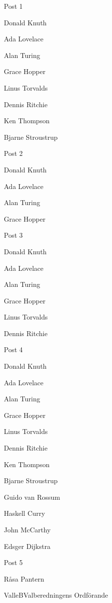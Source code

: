 \documentclass{dsekelectionproposal}
\begin{document}
\setdate{\today}

\begin{vemsection}

    \begin{vemlist}{Post 1}
        \item Donald Knuth
        \item Ada Lovelace
        \item Alan Turing
        \item Grace Hopper
        \item Linus Torvalds
        \item Dennis Ritchie
        \item Ken Thompson
        \item Bjarne Stroustrup
    \end{vemlist}

    \begin{vemlist}{Post 2}
        \item Donald Knuth
        \item Ada Lovelace
        \item Alan Turing
        \item Grace Hopper
    \end{vemlist}

    \begin{vemlist}{Post 3}
        \item Donald Knuth
        \item Ada Lovelace
        \item Alan Turing
        \item Grace Hopper
        \item Linus Torvalds
        \item Dennis Ritchie
    \end{vemlist}

    \begin{vemlist}{Post 4}
        \item Donald Knuth
        \item Ada Lovelace
        \item Alan Turing
        \item Grace Hopper
        \item Linus Torvalds
        \item Dennis Ritchie
        \item Ken Thompson
        \item Bjarne Stroustrup
        \item Guido van Rossum
        \item Haskell Curry
        \item John McCarthy
        \item Edsger Dijkstra
    \end{vemlist}

    \begin{vemlist}{Post 5}
        \item Råsa Pantern
    \end{vemlist}

\end{vemsection}

\signature{För Valberedningen}{ValleB}{Valberedningens Ordförande}

\begin{statistikpage}


\end{statistikpage}
\end{document}
